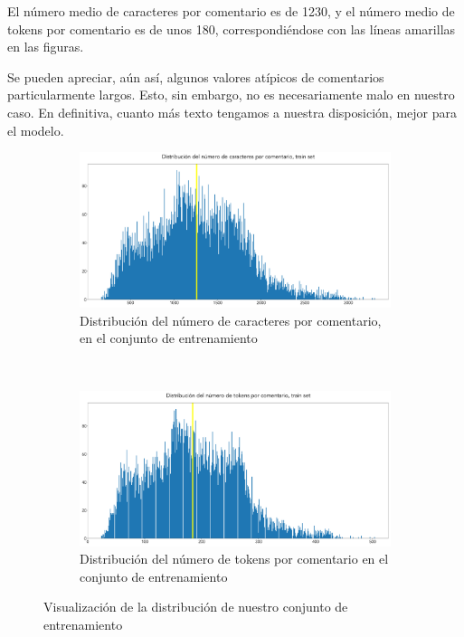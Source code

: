 El número medio de caracteres por comentario es de 1230, y el número medio de tokens por comentario es de unos 180, correspondiéndose con las líneas amarillas en las figuras.

Se pueden apreciar, aún así, algunos valores atípicos de comentarios particularmente largos. Esto, sin embargo, no es necesariamente malo en nuestro caso. En definitiva, cuanto más texto tengamos a nuestra disposición, mejor para el modelo.

\begin{figure}[h!]
	\centering
	\begin{subfigure}[t]{0.95\textwidth}
		\centering
		\includegraphics[width=.9\textwidth]{media/char_hist_train.pdf}
		\caption{Distribución del número de caracteres por comentario, en el conjunto de entrenamiento}
		\label{fig:avg_char_train}
	\end{subfigure}
	~

	\begin{subfigure}[t]{0.95\textwidth}
		\centering
		\includegraphics[width=.9\textwidth]{media/tokens_hist_train.pdf}
		\caption{Distribución del número de tokens por comentario en el conjunto de entrenamiento}
		\label{fig:avg_tokens_train}
	\end{subfigure}

	\caption{Visualización de la distribución de nuestro conjunto de entrenamiento}
	\label{fig:sum_train}
\end{figure}


